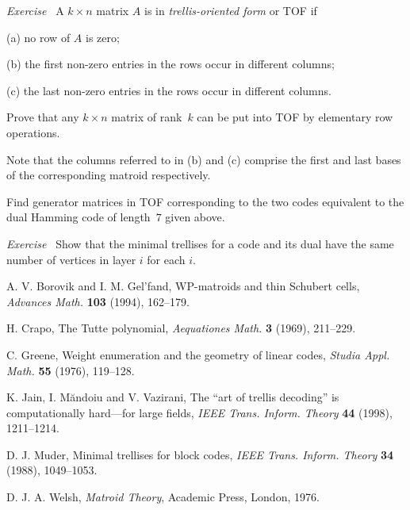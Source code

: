 \documentclass[12pt]{article}
\newcommand{\head}[1]{\medbreak\noindent\textit{#1}\ }
\begin{document}
\head{Exercise} A $k\times n$ matrix $A$ is in \emph{trellis-oriented
form} or TOF if
\begin{description}
\item{(a)} no row of $A$ is zero;
\item{(b)} the first non-zero entries in the rows occur in
different columns;
\item{(c)} the last non-zero entries in the rows occur in
different columns.
\end{description}
Prove that any $k\times n$ matrix of rank~$k$ can be put into
TOF by elementary row operations.

Note that the columns referred to in (b) and (c) comprise the
first and last bases of the corresponding matroid respectively.

Find generator matrices in TOF corresponding to the two codes
equivalent to the dual Hamming code of length~$7$ given above.

\head{Exercise} Show that the minimal trellises for a code and its dual
have the same number of vertices in layer $i$ for each $i$.

\begin{thebibliography}{9}

A. V. Borovik and I. M. Gel'fand,
WP-matroids and thin Schubert cells,
\textit{Advances Math.} \textbf{103} (1994), 162--179.

H. Crapo,
The Tutte polynomial,
\textit{Aequationes Math.} \textbf{3} (1969), 211--229.

C. Greene,
Weight enumeration and the geometry of linear codes,
\textit{Studia Appl. Math.} \textbf{55} (1976), 119--128.

K. Jain, I. M\u{a}ndoiu and V. Vazirani,
The ``art of trellis decoding'' is computationally hard---for
large fields,
\textit{IEEE Trans. Inform. Theory} \textbf{44} (1998), 1211--1214.

D. J. Muder,
Minimal trellises for block codes,
\textit{IEEE Trans. Inform. Theory} \textbf{34} (1988), 1049--1053.

D. J. A. Welsh,
\textit{Matroid Theory},
Academic Press, London, 1976.

\end{thebibliography}
\end{document}
